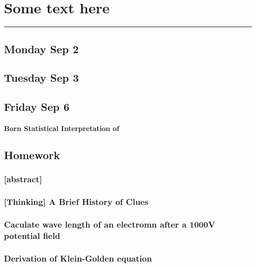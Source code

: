 \section{Some text here}
\vspace{-15pt}\noindent\rule{\textwidth}{0.1pt}\vspace{-10pt}
    \subsection{\hfill \small Monday Sep 2}
    \subsection{\hfill\small Tuesday Sep 3}
    \subsection{\hfill \small Friday Sep 6}
    \paragraph{Born Statistical Interpretation of }
    \subsection*{Homework}
        \subsubsection*{[abstract]}
        \subsubsection{[Thinking] A Brief History of Clues}
        \subsubsection{Caculate wave length of an electromn after a 1000V potential field}
        \subsubsection{Derivation of Klein-Golden equation}